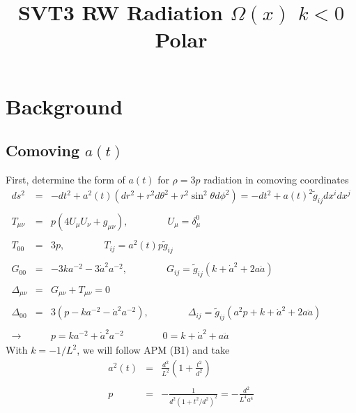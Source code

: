 \documentclass[10pt,letterpaper]{article}
\title{SVT3 RW Radiation $\Omega(x)$ $k<0$ Polar}
\date{}
\numberwithin{equation}{section}
\begin{document}
 
\maketitle
\noindent 
\section{Background}

\subsection{Comoving $a(t)$}
First, determine the form of $a(t)$ for $\rho = 3p$ radiation in comoving coordinates
\begin{eqnarray}
ds^2 &=& -dt^2 + a^2(t)(dr^2 + r^2d\theta^2 + r^2\sin^2\theta d\phi^2) = -dt^2 + a(t)^2 \tilde g_{ij} dx^i dx^j
\\ \nonumber\\
T_{\mu\nu} &=& p(4U_\mu U_\nu + g_{\mu\nu}),\qquad\qquad U_\mu = \delta^0_\mu
\\ \nonumber\\
T_{00} &=& 3p,\qquad\qquad T_{ij} = a^2(t)p \tilde g_{ij}
\\ \nonumber\\
G_{00} &=& -3k a^{-2} -3 \dot a^2 a^{-2},\qquad\qquad G_{ij} = \tilde g_{ij}(k + \dot a^2 + 2 a \ddot a)
\\ \nonumber\\
\Delta_{\mu\nu} &=& G_{\mu\nu}+ T_{\mu\nu} = 0
\\ \nonumber\\
\Delta_{00} &=& 3( p- ka^{-2} -\dot a^2 a^{-2}), \qquad\qquad
\Delta_{ij} = \tilde g_{ij}( a^2 p +k + \dot a^2 + 2a \ddot a)
\\ \nonumber\\
\to  &&\boxed{p= k a^{-2} + \dot a^2 a^{-2}}
\qquad\qquad \boxed{0= k + \dot a^2 + a\ddot a}
\end{eqnarray}
With $k=-1/L^2$, we will follow APM (B1) and take 
\begin{eqnarray}
a^2(t) &=& \frac{d^2}{L^2}\left( 1+ \frac{t^2}{d^2}\right)
\label{a(t)}
\\ \nonumber\\
p &=& -\frac{1}{d^2(1+t^2/d^2)^2} = -\frac{d^2}{L^4 a^4}
\end{eqnarray}

\end{document}

